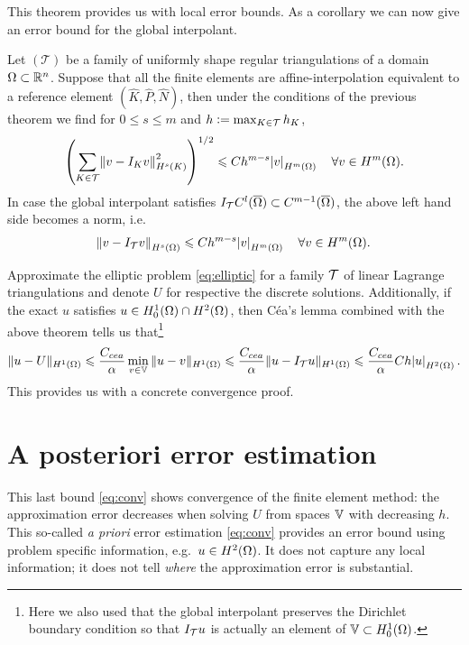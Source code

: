 \documentclass[thesis.tex]{subfiles}
\begin{document}
  This theorem provides us with local error bounds. As a corollary we can now
  give an error bound for the global interpolant.
  \begin{thm}
    \label{thm:apriorio}
    Let $(\mathcal{T})$ be a family of uniformly shape regular triangulations of a domain~$\Omega \subset \mathbb{R}^n$.
    Suppose that all the finite elements are affine-interpolation equivalent to a reference element $(\hat K, \hat P, \hat N)$,
    then under the conditions of the previous theorem we find for $0 \leq s \leq m$ and $h  := \max_{ K \in \mathcal{T}} h_K$,
    \[
      \left( \sum_{K \in \mathcal{T}} \norm{v - I_K v}^2_{H^s(K)}\right)^{1/2} \leqslant C h^{m-s} \abs{v}_{H^m(\Omega)} \quad \forall v \in H^m(\Omega).
    \]
    In case the global interpolant satisfies $I_{\mathcal{T}} C^l(\overline{\Omega}) \subset C^{m-1}(\overline{\Omega})$, the above left hand side becomes a norm, i.e.~
    \[
      \norm{v - I_{\mathcal{T}}v}_{H^s(\Omega)} \leqslant C h^{m-s} \abs{v}_{H^m(\Omega)} \quad \forall v \in H^m(\Omega).
    \]
  \end{thm}
  Approximate the elliptic problem \eqref{eq:elliptic}  for a family $\mathcal{T}$ of linear Lagrange triangulations and denote $U$
  for respective the discrete solutions.
  Additionally, if the exact $u$ satisfies $u \in H_0^1(\Omega)\cap H^2(\Omega)$, then C\'ea's lemma combined with the above theorem tells us that\footnote{
  Here we also used that the global interpolant preserves the Dirichlet boundary condition so that
   $I_{\mathcal{T}} u$ is actually an element of $\mathbb{V} \subset H_0^1(\Omega)$.}
  \begin{equation}
    \label{eq:conv}
    \|u - U\|_{H^1(\Omega)} \leqslant \frac{C_{cea}}{\alpha} \min_{v \in \mathbb{V}} \| u - v\|_{H^1(\Omega)} \leqslant \frac{C_{cea}}{\alpha} \| u - I_{\mathcal{T}}u \|_{H^1(\Omega)} \leqslant \frac{C_{cea}}{\alpha} C  h \abs{u}_{H^2(\Omega)}.
  \end{equation}
  This provides us with a concrete convergence proof.

  \section{A posteriori error estimation}
  \label{sec:afem}
  This last bound \eqref{eq:conv} shows convergence of the finite element method: the approximation error decreases when solving $U$ from spaces $\mathbb{V}$ with 
  decreasing $h$. 
  This so-called \emph{a priori} error estimation \eqref{eq:conv} provides an error bound
  using problem specific information, e.g.~${u \in H^2(\Omega)}$. It does not capture
  any local information; it does not tell \emph{where} the approximation error is substantial. 
  
\end{document}
